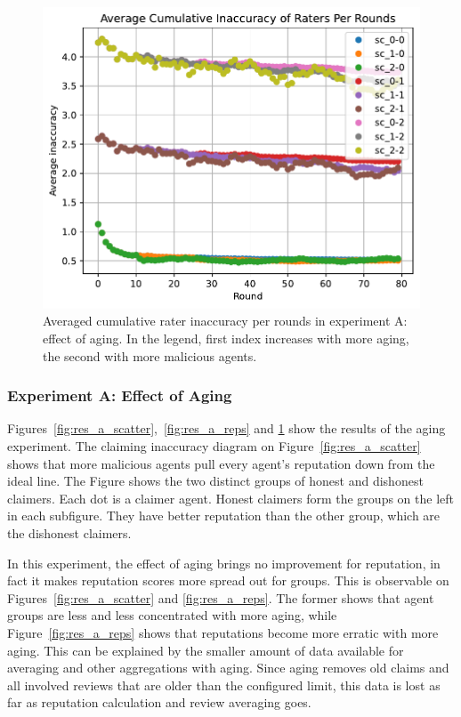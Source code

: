 \documentclass[%
    ]{\PathToTumTemplate/thesis/tum_thesis}
\begin{document}
\begin{figure}[]
  \begin{center}
        \includegraphics[width=0.75\linewidth]	{../results/a/AvgAccuracyPerRound.pdf}
    \caption{
    Averaged cumulative rater inaccuracy per rounds in experiment A: effect of aging.
    In the legend, first index increases with more aging, the second with more malicious agents.
    }
    \label{fig:res_a_rateinaccuracy}
  \end{center}
\end{figure}


\subsubsection{Experiment A: Effect of Aging}

Figures~\ref{fig:res_a_scatter},~\ref{fig:res_a_reps} and \ref{fig:res_a_rateinaccuracy} show the results of the aging experiment.
The claiming inaccuracy diagram on Figure~\ref{fig:res_a_scatter} shows that more malicious agents pull every agent's reputation down from the ideal line.
The Figure shows the two distinct groups of honest and dishonest claimers.
Each dot is a claimer agent.
Honest claimers form the groups on the left in each subfigure.
They have better reputation than the other group, which are the dishonest claimers.

In this experiment, the effect of aging brings no improvement for reputation, in fact it makes reputation scores more spread out for groups.
This is observable on Figures~\ref{fig:res_a_scatter} and \ref{fig:res_a_reps}.
The former shows that agent groups are less and less concentrated with more aging, while Figure~\ref{fig:res_a_reps} shows that reputations become more erratic with more aging.
This can be explained by the smaller amount of data available for averaging and other aggregations with aging.
Since aging removes old claims and all involved reviews that are older than the configured limit, this data is lost as far as reputation calculation and review averaging goes.
\end{document}
